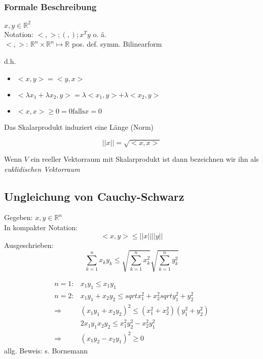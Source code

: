 
\subsubsection*{Formale Beschreibung}
\begin{definition}[Skalarprodukt]\flush
$ x, y \in \mathbb{R}^2 $ \\
Notation: $ <, >; (, ); x^T y$ o. ä. \\
$<, >$: $\mathbb{R}^n \times \mathbb{R}^n \mapsto \mathbb{R}$ pos. def. symm. Bilinearform
\end{definition}

d.h. \begin{itemize}
	\item $ <x, y> = <y, x>$
	\item $ <\lambda x_1 + \lambda x_2, y> = \lambda <x_1, y> + \lambda <x_2, y>$
	\item $ <x, x> \geq 0 = 0 \text{falls} x = 0$
\end{itemize}

Das Skalarprodukt induziert eine Länge (Norm)

\begin{equation*}
	|| x || = \sqrt{<x, x>}
\end{equation*}

Wenn $V$ ein reeller Vektorraum mit Skalarprodukt ist dann bezeichnen wir ihn als \emph{euklidischen Vektorraum}

\subsection{Ungleichung von Cauchy-Schwarz}
Gegeben: $x, y \in \mathbb{R}^n$\\
In kompakter Notation:
\begin{equation*}
	<x, y> \leq || x || || y ||
\end{equation*}
Ausgeschrieben:
\begin{equation*}
	\sum_{k=1}^n x_k y_k \leq \sqrt{\sum_{k=1}^n x_k^2} \sqrt{\sum_{k=1}^n y_k^2} 
\end{equation*} 

\begin{align*}
	n = 1:& x_1 y_1 \leq x_1 y_1 \\
	n = 2:& x_1 y_1 + x_2 y_2 \leq sqrt{x_1^2 + x_2^2} sqrt{y_1^2 + y_2^2} \\
	\Rightarrow& (x_1 y_1 + x_2 y_2)^2 \leq (x_1^2 + x_2^2) (y_1^2 + y_2^2) \\
	& 2 x_1 y_1 x_2 y_2 \leq x_1^2 y_2^2 - x_2^2 y_1^2 \\
	\Rightarrow& (x_1 y_2 -  x_2 y_1)^2 \geq 0
\end{align*}
allg. Beweis: s. Bornemann

